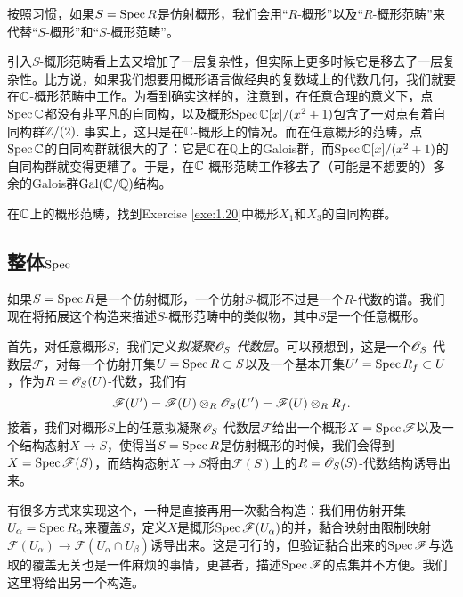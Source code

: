 按照习惯，如果$S=\operatorname{Spec} R$是仿射概形，我们会用“$R$-概形”以及“$R$-概形范畴”来代替“$S$-概形”和“$S$-概形范畴”。

引入$S$-概形范畴看上去又增加了一层复杂性，但实际上更多时候它是移去了一层复杂性。比方说，如果我们想要用概形语言做经典的复数域上的代数几何，我们就要在$\mathbb{C}$-概形范畴中工作。为看到确实这样的，注意到，在任意合理的意义下，点$\operatorname{Spec} \mathbb{C}$都没有非平凡的自同构，以及概形$\operatorname{Spec} \mathbb{C}[x]/(x^2+1)$包含了一对点有着自同构群$\mathbb{Z}/(2)$. 事实上，这只是在$\mathbb{C}$-概形上的情况。而在任意概形的范畴，点$\operatorname{Spec} \mathbb{C}$的自同构群就很大的了：它是$\mathbb{C}$在$\mathbb Q$上的Galois群，而$\operatorname{Spec} \mathbb{C}[x]/(x^2+1)$的自同构群就变得更糟了。于是，在$\mathbb{C}$-概形范畴工作移去了（可能是不想要的）多余的Galois群$\mathrm{Gal}(\mathbb{C}/\mathbb Q)$结构。

\begin{exe}\label{exe:1.50}
在$\mathbb{C}$上的概形范畴，找到Exercise \ref{exe:1.20}中概形$X_1$和$X_3$的自同构群。
\end{exe}

\subsection{整体$\operatorname{Spec}$} \label{s:1.3.3}

如果$S=\operatorname{Spec} R$是一个仿射概形，一个仿射$S$-概形不过是一个$R$-代数的谱。我们现在将拓展这个构造来描述$S$-概形范畴中的类似物，其中$S$是一个任意概形。

首先，对任意概形$S$，我们定义\textit{拟凝聚$\mathscr{O}_S$-代数层}。可以预想到，这是一个$\mathscr{O}_S$-代数层$\mathscr F$，对每一个仿射开集$U=\operatorname{Spec} R\subset S$以及一个基本开集$U'=\operatorname{Spec} R_f\subset U$，作为$R=\mathscr{O}_S(U)$-代数，我们有
\[
	\mathscr F(U')=\mathscr F(U)\otimes_R \mathscr{O}_S(U')=\mathscr F(U)\otimes_R R_f.
\]
接着，我们对概形$S$上的任意拟凝聚$\mathscr{O}_S$-代数层$\mathscr F$给出一个概形$X=\operatorname{Spec} \mathscr F$以及一个结构态射$X\to S$，使得当$S=\operatorname{Spec} R$是仿射概形的时候，我们会得到$X=\operatorname{Spec} \mathscr F(S)$，而结构态射$X\to S$将由$\mathscr F(S)$上的$R=\mathscr{O}_S(S)$-代数结构诱导出来。

有很多方式来实现这个，一种是直接再用一次黏合构造：我们用仿射开集$U_\alpha=\operatorname{Spec} R_\alpha$来覆盖$S$，定义$X$是概形$\operatorname{Spec} \mathscr F(U_\alpha)$的并，黏合映射由限制映射$\mathscr F(U_\alpha)\to \mathscr F(U_\alpha\cap U_\beta)$诱导出来。这是可行的，但验证黏合出来的$\operatorname{Spec} \mathscr F$与选取的覆盖无关也是一件麻烦的事情，更甚者，描述$\operatorname{Spec} \mathscr F$的点集并不方便。我们这里将给出另一个构造。

